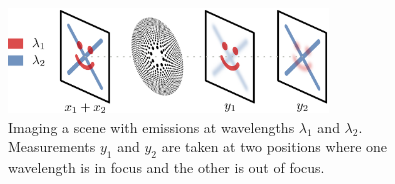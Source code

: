 \documentclass{article}
\begin{document}




\begin{figure}[htb]
  \begin{minipage}[b]{1\linewidth}
    \centering
    \centerline{\includegraphics[width=8.5cm]{drawing}}
  \end{minipage}
  \caption{Imaging a scene with emissions at wavelengths $\lambda_1$ and
  $\lambda_2$. Measurements $y_1$ and $y_2$ are taken at two positions where one wavelength
  is in focus and the other is out of focus.}
  \label{fig:pssi_drawing}
\end{figure}


\end{document}
